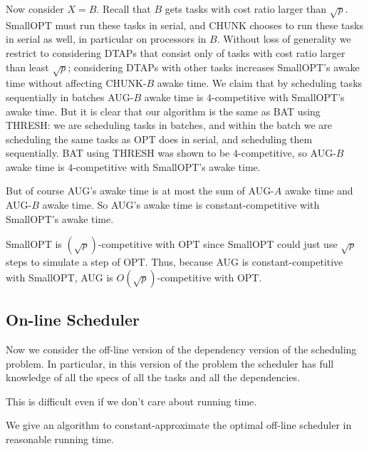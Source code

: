 Now consider $X=B$. Recall that $B$ gets tasks with cost ratio
larger than $\sqrt{p}$. SmallOPT must run these tasks in serial,
and CHUNK chooses to run these tasks in serial as well, in
particular on processors in $B$. Without loss of generality we
restrict to considering DTAPs that consist only of tasks with
cost ratio larger than least $\sqrt{p}$; considering DTAPs with
other tasks increases SmallOPT's awake time without affecting
CHUNK-$B$ awake time. We claim that by scheduling tasks
sequentially in batches AUG-$B$ awake time is $4$-competitive with SmallOPT's
awake time. But it is clear that our algorithm is the same as BAT using
THRESH: we are scheduling tasks in batches,
and within the batch we are scheduling the same tasks as OPT does
in serial, and scheduling them sequentially. BAT using THRESH was
shown to be $4$-competitive, so AUG-$B$ awake time is
$4$-competitive with SmallOPT's awake time.

But of course AUG's awake time is at most the sum of AUG-$A$
awake time and AUG-$B$ awake time. So AUG's awake time is
constant-competitive with SmallOPT's awake time.

SmallOPT is $(\sqrt{p})$-competitive with OPT since SmallOPT
could just use $\sqrt{p}$ steps to simulate a step of OPT. Thus,
because AUG is constant-competitive with SmallOPT, AUG is
$O(\sqrt{p})$-competitive with OPT. 

\subsection{On-line Scheduler}
Now we consider the off-line version of the dependency version of
the scheduling problem. In particular, in this version of the
problem the scheduler has full knowledge of all the specs of all
the tasks and all the dependencies.

This is difficult even if we don't care about running time.

We give an algorithm to constant-approximate the optimal off-line
scheduler in reasonable running time.

